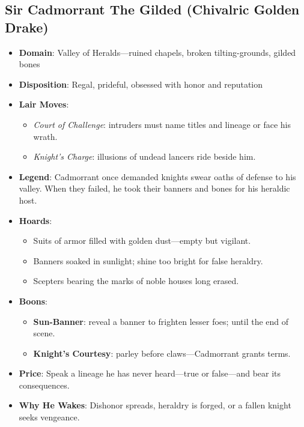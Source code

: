 \documentclass[11pt,letterpaper]{article}
\begin{document}
\subsection{Sir Cadmorrant The Gilded (Chivalric Golden Drake)}
\begin{itemize}
\item \textbf{Domain}: Valley of Heralds---ruined chapels, broken tilting-grounds, gilded bones
\item \textbf{Disposition}: Regal, prideful, obsessed with honor and reputation
\item \textbf{Lair Moves}:
  \begin{itemize}
  \item \emph{Court of Challenge}: intruders must name titles and lineage or face his wrath.
  \item \emph{Knight's Charge}: illusions of undead lancers ride beside him.
  \end{itemize}
\item \textbf{Legend}: Cadmorrant once demanded knights swear oaths of defense to his valley. When they failed, he took their banners and bones for his heraldic host.
\item \textbf{Hoards}:
  \begin{itemize}
  \item Suits of armor filled with golden dust---empty but vigilant.
  \item Banners soaked in sunlight; shine too bright for false heraldry.
  \item Scepters bearing the marks of noble houses long erased.
  \end{itemize}
\item \textbf{Boons}:
  \begin{itemize}
  \item \textbf{Sun-Banner}: reveal a banner to frighten lesser foes;  until the end of scene.
  \item \textbf{Knight's Courtesy}: parley before claws---Cadmorrant grants terms.
  \end{itemize}
\item \textbf{Price}: Speak a lineage he has never heard---true or false---and bear its consequences.
\item \textbf{Why He Wakes}: Dishonor spreads, heraldry is forged, or a fallen knight seeks vengeance.
\end{itemize}

\end{document}
